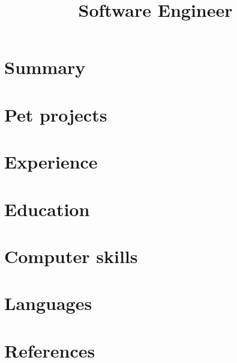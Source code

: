 \documentclass[11pt,a4paper]{moderncv}
\title{Software Engineer}
\begin{document}
\renewcommand*{\bibliographyhead}[1]{}

\maketitle

\section{Summary}

\section{Pet projects}

\section{Experience}

\section{Education}

\section{Computer skills}

\section{Languages}

\section{References}
\end{document}
